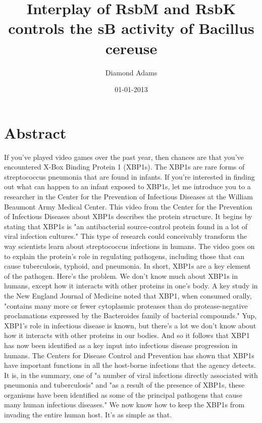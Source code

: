 \documentclass{article}%
\title{Interplay of RsbM and RsbK controls the sB activity of Bacillus cereuse}%
\author{Diamond Adams}%
\affil{Oncology Research, Pfizer Worldwide Research and Development, San Diego, California, United States of America}%
\date{01{-}01{-}2013}%
\begin{document}
%
\normalsize%
\maketitle%
\section{Abstract}%
\label{sec:Abstract}%
If you've played video games over the past year, then chances are that you've encountered X{-}Box Binding Protein 1 (XBP1s). The XBP1s are rare forms of streptococcus pneumonia that are found in infants. If you're interested in finding out what can happen to an infant exposed to XBP1s, let me introduce you to a researcher in the Center for the Prevention of Infectious Diseases at the William Beaumont Army Medical Center.\newline%
This video from the Center for the Prevention of Infectious Diseases about XBP1s describes the protein structure. It begins by stating that XBP1s is "an antibacterial source{-}control protein found in a lot of viral infection cultures." This type of research could conceivably transform the way scientists learn about streptococcus infections in humans. The video goes on to explain the protein's role in regulating pathogens, including those that can cause tuberculosis, typhoid, and pneumonia. In short, XBP1s are a key element of the pathogen.\newline%
Here's the problem. We don't know much about XBP1s in humans, except how it interacts with other proteins in one's body. A key study in the New England Journal of Medicine noted that XBP1, when consumed orally, "contains many more or fewer cytoplasmic proteases than do protease{-}negative proclamations expressed by the Bacteroides family of bacterial compounds." Yup, XBP1's role in infectious disease is known, but there's a lot we don't know about how it interacts with other proteins in our bodies. And so it follows that XBP1 has now been identified as a key input into infectious disease progression in humans.\newline%
The Centers for Disease Control and Prevention has shown that XBP1s have important functions in all the host{-}borne infections that the agency detects. It is, in the summary, one of "a number of viral infections directly associated with pneumonia and tuberculosis" and "as a result of the presence of XBP1s, these organisms have been identified as some of the principal pathogens that cause many human infectious diseases." We now know how to keep the XBP1s from invading the entire human host. It's as simple as that.\newline%
\end{document}
